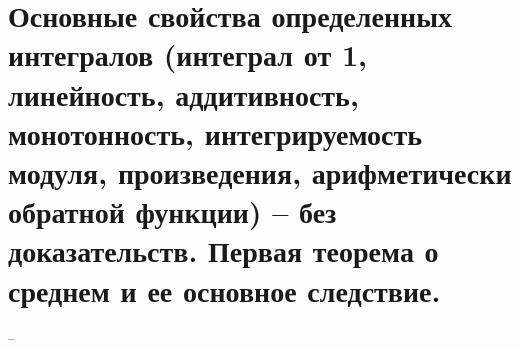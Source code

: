 \section{Основные свойства определенных интегралов (интеграл от 1, линейность, аддитивность, монотонность, интегрируемость модуля, произведения, арифметически обратной функции) -- без доказательств. Первая теорема о среднем и ее основное следствие.}
--
\newline